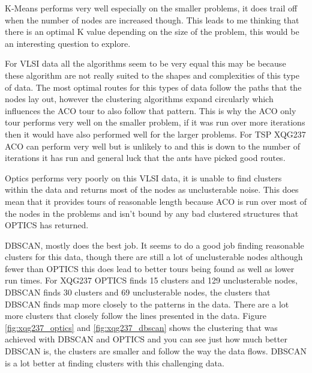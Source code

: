 K-Means performs very well especially on the smaller problems, it does trail off when the number of nodes are increased though. This leads to me thinking that there is an optimal K value depending on the size of the problem, this would be an interesting question to explore. 

For VLSI data all the algorithms seem to be very equal this may be because these algorithm are not really suited to the shapes and complexities of this type of data. The most optimal routes for this types of data follow the paths that the nodes lay out, however the clustering algorithms expand circularly which influences the ACO tour to also follow that pattern. This is why the ACO only tour performs very well on the smaller problem, if it was run over more iterations then it would have also performed well for the larger problems. For TSP XQG237 ACO can perform very well but is unlikely to and this is down to the number of iterations it has run and general luck that the ants have picked good routes.

Optics performs very poorly on this VLSI data, it is unable to find clusters within the data and returns most of the nodes as unclusterable noise. This does mean that it provides tours of reasonable length because ACO is run over most of the nodes in the problems and isn't bound by any bad clustered structures that OPTICS has returned.

DBSCAN, mostly does the best job. It seems to do a good job finding reasonable clusters for this data, though there are still a lot of unclusterable nodes although fewer than OPTICS this does lead to better tours being found as well as lower run times. For XQG237 OPTICS finds 15 clusters and 129 unclusterable nodes, DBSCAN finds 30 clusters and 69 unclusterable nodes, the clusters that DBSCAN finds map more closely to the patterns in the data. There are a lot more clusters that closely follow the lines presented in the data. Figure \ref{fig:xqg237_optics} and \ref{fig:xqg237_dbscan} shows the clustering that was achieved with DBSCAN and OPTICS and you can see just how much better DBSCAN is, the clusters are smaller and follow the way the data flows. DBSCAN is a lot better at finding clusters with this challenging data.


